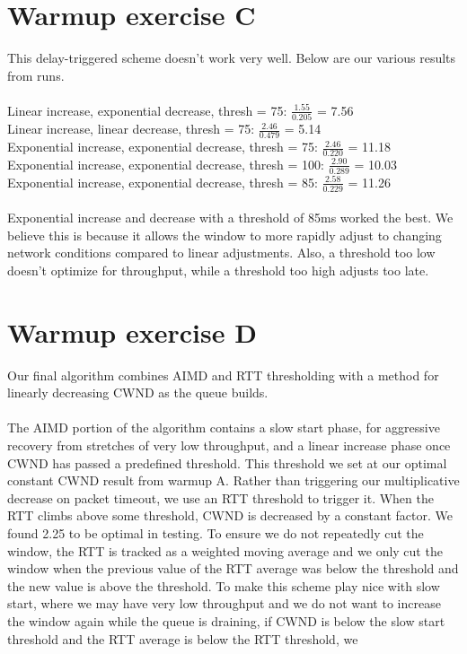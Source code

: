 \documentclass[12pt]{article}
\begin{document}
\section*{Warmup exercise C}
	This delay-triggered scheme doesn't work very well. Below are our various results from runs.
\\
\\
Linear increase, exponential decrease, thresh = 75: $\frac{1.55}{0.205}$ = 7.56 \\
Linear increase, linear decrease, thresh =  75: $\frac{2.46}{0.479}$ = 5.14 \\
Exponential increase, exponential decrease, thresh =  75: $\frac{2.46}{0.220}$ = 11.18 \\
Exponential increase, exponential decrease, thresh =  100: $\frac{2.90}{0.289}$ = 10.03 \\
Exponential increase, exponential decrease, thresh =  85: $\frac{2.58}{0.229}$ = 11.26 \\
\\
Exponential increase and decrease with a threshold of 85ms worked the best. We believe this is because it allows the window to more rapidly adjust to changing network conditions compared to linear adjustments. Also, a threshold too low doesn't optimize for throughput, while a threshold too high adjusts too late. 

\section*{Warmup exercise D}
Our final algorithm combines AIMD and RTT thresholding with a method for linearly decreasing CWND as the queue builds. \\ 
\\
The AIMD portion of the algorithm contains a slow start phase, for aggressive recovery from stretches of very low throughput, and a linear increase phase once CWND has passed a predefined threshold. This threshold we set at our optimal constant CWND result from warmup A. Rather than triggering our multiplicative decrease on packet timeout, we use an RTT threshold to trigger it. When the RTT climbs above some threshold, CWND is decreased by a constant factor. We found 2.25 to be optimal in testing. To ensure we do not repeatedly cut the window, the RTT is tracked as a weighted moving average and we only cut the window when the previous value of the RTT average was below the threshold and the new value is above the threshold. To make this scheme play nice with slow start, where we may have very low throughput and we do not want to increase the window again while the queue is draining, if CWND is below the slow start threshold and the RTT average is below the RTT threshold, we 
	
		
\end{document}
